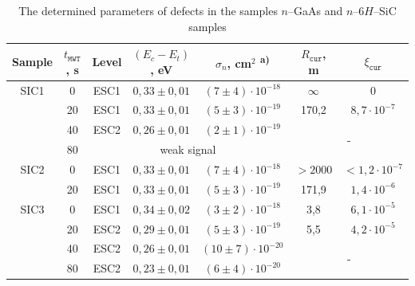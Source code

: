 \documentclass[final,3p,times,twocolumn,authoryear]{elsarticle}
\begin{document}

\begin{table}
\caption{\label{tabMW}The determined parameters of defects in the samples $n$--GaAs and $n$--6$H$--SiC samples
}
\center
\begin{tabular}{ccccccc}
\hline
Sample& $t_\mathtt{MWT}$, s &Level &$(E_c-E_t)$, eV &$\sigma_n$, cm$^2$\textsuperscript{ a)}&$R_\mathtt{cur}$, m&$\xi_\mathtt{cur}$\\
\hline
SIC1& 0 &ESC1& $0,33\pm0,01$ &$(7\pm4)\cdot10^{-18}$&$\infty$&0\\ %
& 20 &ESC1& $0,33\pm0,01$ &$(5\pm3)\cdot10^{-19}$&170,2&$8,7\cdot10^{-7}$\\ %
& 40 &ESC2& $0,26\pm0,01$ &$(2\pm1)\cdot10^{-19}$&\multicolumn{2}{c}{\multirow{2}{*}{-}}\\ %
& 80 & \multicolumn{3}{c}{weak signal}&\multicolumn{2}{c}{}\\ %
SIC2& 0 &ESC1& $0,33\pm0,01$ &$(7\pm4)\cdot10^{-18}$&$>2000$&$<1,2\cdot10^{-7}$\\ %
& 20 &ESC1& $0,33\pm0,01$ &$(5\pm3)\cdot10^{-19}$&171,9&$1,4\cdot10^{-6}$\\ %
SIC3& 0 &ESC1& $0,34\pm0,02$ &$(3\pm2)\cdot10^{-18}$&3,8&$6,1\cdot10^{-5}$\\ %
& 20 &ESC2&$0,29\pm0,01$ &$(5\pm3)\cdot10^{-19}$&5,5&$4,2\cdot10^{-5}$\\ %
& 40 &ESC2& $0,26\pm0,01$ &$(10\pm7)\cdot10^{-20}$&\multicolumn{2}{c}{\multirow{2}{*}{-}}\\ %
& 80 &ESC2& $0,23\pm0,01$ &$(6\pm4)\cdot10^{-20}$&\multicolumn{2}{c}{}\\ %

\end{tabular}
\end{table}
\end{document}
